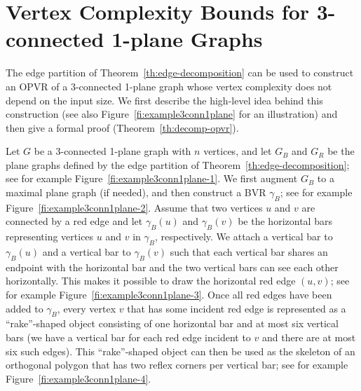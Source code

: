 \documentclass{article}
\newcommand{\opvr}{OPVR\xspace}
\begin{document}
\section{Vertex Complexity Bounds for 3-connected 1-plane Graphs}\label{se:3conn-bounds}

The edge partition of Theorem~\ref{th:edge-decomposition} can be used to construct an \opvr of a 3-connected 1-plane graph whose vertex complexity does not depend on the input size. We first describe the high-level idea behind this construction (see also Figure~\ref{fi:example3conn1plane} for an illustration) and then give a formal proof (Theorem~\ref{th:decomp-opvr}). 

Let $G$ be a 3-connected 1-plane graph with $n$ vertices, and let $G_B$ and $G_R$ be the plane graphs defined by the edge partition of Theorem~\ref{th:edge-decomposition}; see for example Figure~\ref{fi:example3conn1plane-1}. We first augment $G_B$ to a maximal plane graph (if needed), and then construct a BVR $\gamma_B$; see for example Figure~\ref{fi:example3conn1plane-2}. Assume that two vertices $u$ and $v$ are connected by a red edge and let $\gamma_B(u)$ and $\gamma_B(v)$ be the horizontal bars representing vertices $u$ and $v$ in $\gamma_B$, respectively. We attach a vertical bar to $\gamma_B(u)$ and a vertical bar to $\gamma_B(v)$ such that each vertical bar shares an endpoint with the horizontal bar and the two vertical bars can see each other horizontally. This makes it possible to draw the horizontal red edge $(u,v)$; see for example Figure~\ref{fi:example3conn1plane-3}.  Once all red edges have been added to $\gamma_B$, every vertex $v$ that has some incident red edge is represented as a ``rake''-shaped object consisting of one horizontal bar and at most six vertical bars (we have a vertical bar for each red edge incident to $v$ and there are at most six such edges). This ``rake''-shaped object can then be used as the skeleton of an orthogonal polygon that has two reflex corners per vertical bar; see for example Figure~\ref{fi:example3conn1plane-4}.
\end{document}
